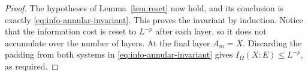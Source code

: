 \begin{proof}
The hypotheses of Lemma~\ref{lem:reset} now hold, and its conclusion
is exactly \eqref{eq:info-annular-invariant}.  This proves the invariant
by induction.  Notice that the information cost is reset to $L^{-p}$
after each layer, so it does not accumulate over the number of layers.
At the final layer $A_m=X$.  Discarding the padding from both systems
in \eqref{eq:info-annular-invariant} gives
$I_\Omega(X:E)\le L^{-p}$, as required.
\end{proof}

